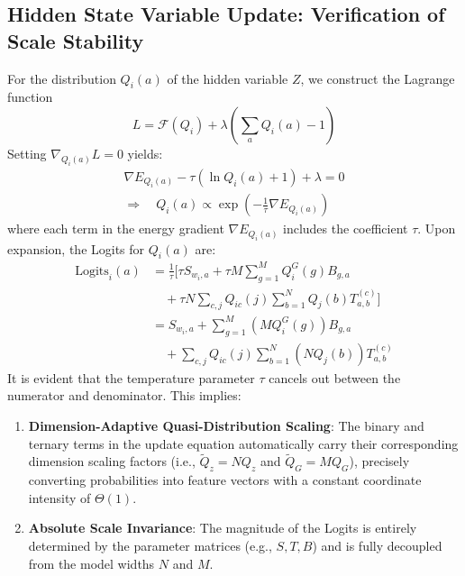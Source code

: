 \documentclass[11pt]{article}
\begin{document}
\subsection{Hidden State Variable Update: Verification of Scale Stability}

For the distribution $Q_i(a)$ of the hidden variable $Z$, we construct the Lagrange function 
\begin{equation}
    L = \mathcal{F}(Q_i) + \lambda(\sum_a Q_i(a) - 1)
\end{equation}
Setting $\nabla_{Q_i(a)} L = 0$ yields:
\begin{equation}
\begin{split}
\nabla E_{Q_i(a)} - \tau (\ln Q_i(a) + 1) + \lambda = 0 \\
\Rightarrow \quad Q_i(a) \propto \exp \left( -\frac{1}{\tau} \nabla E_{Q_i(a)} \right)
\end{split}
\end{equation}
where each term in the energy gradient $\nabla E_{Q_i(a)}$ includes the coefficient $\tau$. Upon expansion, the Logits for $Q_i(a)$ are:
\begin{equation}
\begin{split}
\text{Logits}_i(a) &= \frac{1}{\tau} \Big[ \tau S_{w_i,a}+ \tau M \sum_{g=1}^M Q_i^G(g) B_{g,a} \\
&\quad + \tau N \sum_{c,j} Q_{ic}(j) \sum_{b=1}^N Q_j(b) T_{a,b}^{(c)} \Big] \\
&= S_{w_i,a} + \sum_{g=1}^M (M Q_i^G(g)) B_{g,a} \\
&\quad + \sum_{c,j} Q_{ic}(j) \sum_{b=1}^N (N Q_j(b)) T_{a,b}^{(c)}
\end{split}
\end{equation}
It is evident that the temperature parameter $\tau$ cancels out between the numerator and denominator. This implies:
\begin{enumerate}
    \item \textbf{Dimension-Adaptive Quasi-Distribution Scaling}: The binary and ternary terms in the update equation automatically carry their corresponding dimension scaling factors (i.e., $\tilde{Q}_z = N Q_z$ and $\tilde{Q}_G = M Q_G$), precisely converting probabilities into feature vectors with a constant coordinate intensity of $\Theta(1)$.
    \item \textbf{Absolute Scale Invariance}: The magnitude of the Logits is entirely determined by the parameter matrices (e.g., $S, T, B$) and is fully decoupled from the model widths $N$ and $M$.
\end{enumerate}
\end{document}
